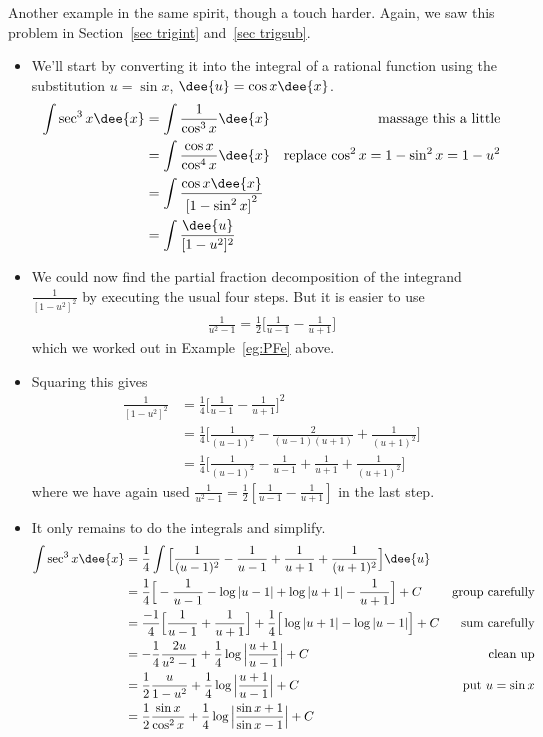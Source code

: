 Another example in the same spirit, though a touch harder. Again, we saw this problem
in Section~\ref{sec trigint} and~\ref{sec trigsub}.
\begin{eg}\label{eg:PFf}

\soln
\begin{itemize}
 \item We'll start by converting it into the integral of a rational function using the
substitution $u=\sin x$, $\dee{u}=\cos x\dee{x}$.
\begin{align*}
\int \sec^3 x\dee{x}
&=\int \frac{1}{\cos^3 x}\dee{x} & \text{massage this a little}\\
&=\int \frac{\cos x}{\cos^4 x}\dee{x} &\text{replace $\cos^2x=1-\sin^2x=1-u^2$}\\
&=\int \frac{\cos x\dee{x}}{{[1-\sin^2 x]}^2}\\
&=\int \frac{\dee{u}}{ [1-u^2]^2}
\end{align*}

\item We could now find the partial fraction decomposition of the integrand
$\frac{1}{ {[1-u^2]}^2}$ by executing the usual four steps. But it is
easier to use
\begin{align*}
\frac{1}{u^2-1}
=\frac{1}{2}\Big[\frac{1}{u-1}-\frac{1}{u+1}\Big]
\end{align*}
which we worked out in Example~\ref{eg:PFe} above.

\item Squaring this gives
\begin{align*}
\frac{1}{ {[1-u^2]}^2} &= \frac{1}{4}\Big[\frac{1}{u-1}-\frac{1}{u+1}\Big]^2\\
&=\frac{1}{4}
\Big[\frac{1}{(u-1)^2}-\frac{2}{(u-1)(u+1)}+\frac{1}{(u+1)^2}\Big]\\
&=\frac{1}{4}
\Big[\frac{1}{(u-1)^2}-\frac{1}{u-1}+\frac{1}{u+1}+\frac{1}{(u+1)^2}\Big]
\end{align*}
where we have again used
$\frac{1}{u^2-1}=\frac{1}{2}\left[\frac{1}{u-1}-\frac{1}{u+1}\right]$ in the last step.

\item It only remains to do the integrals and simplify.
\begin{align*}
\int \sec^3 x\dee{x}
&= \frac{1}{4} \int
  \Big[\frac{1}{(u-1)^2}-\frac{1}{u-1}+\frac{1}{u+1}+\frac{1}{(u+1)^2}\Big]
   \dee{u} \\
&=\frac{1}{4}\Big[-\frac{1}{u-1}-\log|u-1|+\log|u+1|-\frac{1}{u+1}\Big]+C
&\text{group carefully}  \\
&= \frac{-1}{4}\Big[\frac{1}{u-1} + \frac{1}{u+1} \Big]
+ \frac{1}{4} \Big[ \log|u+1| - \log|u-1| \Big] + C
&\text{sum carefully}
\\
&=-\frac{1}{4}\frac{2u}{u^2-1}+\frac{1}{4}\log\Big|\frac{u+1}{u-1}\Big|+C
&\text{clean up}\\
&= \frac{1}{2}\frac{u}{1-u^2}+\frac{1}{4}\log\Big|\frac{u+1}{u-1}\Big|+C
& \text{put $u=\sin x$}\\
& =\frac{1}{2}\frac{\sin x}{\cos^2x}
          +\frac{1}{4}\log\Big|\frac{\sin x+1}{\sin x-1}\Big|+C
\end{align*}
\end{itemize}
\end{eg}

